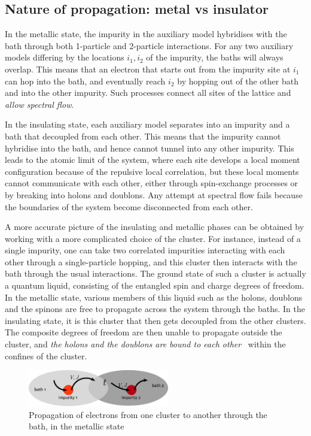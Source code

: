 \documentclass{report}
\numberwithin{equation}{section}
\begin{document}
\subsection{Nature of propagation: metal vs insulator}
In the metallic state, the impurity in the auxiliary model hybridises with the bath through both 1-particle and 2-particle interactions. For any two auxiliary models differing by the locations \(i_1, i_2\) of the impurity, the baths will always overlap. This means that an electron that starts out from the impurity site at \(i_1\) can hop into the bath, and eventually reach \(i_2\) by hopping out of the other bath and into the other impurity. Such processes connect all sites of the lattice and \textit{allow spectral flow}.

In the insulating state, each auxiliary model separates into an impurity and a bath that decoupled from each other. This means that the impurity cannot hybridise into the bath, and hence cannot tunnel into any other impurity. This leads to the atomic limit of the system, where each site develops a local moment configuration because of the repulsive local correlation, but these local moments cannot communicate with each other, either through spin-exchange processes or by breaking into holons and doublons. Any attempt at spectral flow fails because the boundaries of the system become disconnected from each other.

A more accurate picture of the insulating and metallic phases can be obtained by working with a more complicated choice of the cluster. For instance, instead of a single impurity, one can take two correlated impurities interacting with each other through a single-particle hopping, and this cluster then interacts with the bath through the usual interactions. The ground state of such a cluster is actually a quantum liquid, consisting of the entangled spin and charge degrees of freedom. In the metallic state, various members of this liquid such as the holons, doublons and the spinons are free to propagate across the system through the baths. In the insulating state, it is this cluster that then gets decoupled from the other clusters. The composite degrees of freedom are then unable to propagate outside the cluster, and \textit{the holons and the doublons are bound to each other}~\cite{Mott_1949} within the confines of the cluster.

\begin{figure}[ht]
	\centering
	\includegraphics[width=0.55\textwidth]{../figures/metal_prop.pdf}
	\caption{Propagation of electrons from one cluster to another through the bath, in the metallic state}
\end{figure}
\end{document}
